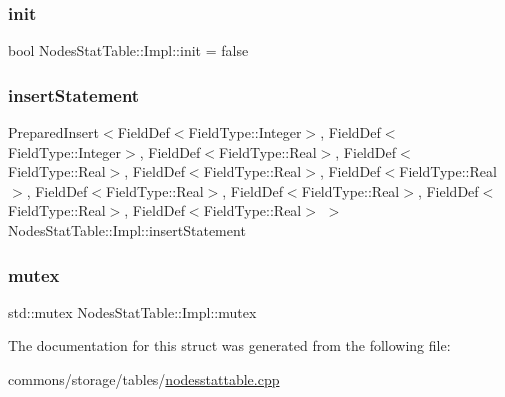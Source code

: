 \mbox{\label{struct_nodes_stat_table_1_1_impl_a9b36da64b39ad87cffd19c5b374efe1b}} 
\subsubsection{\texorpdfstring{init}{init}}
{\footnotesize\ttfamily bool Nodes\+Stat\+Table\+::\+Impl\+::init = false}

\mbox{\label{struct_nodes_stat_table_1_1_impl_aab28521342ff3e319b9451fb42a2c857}} 
\subsubsection{\texorpdfstring{insertStatement}{insertStatement}}
{\footnotesize\ttfamily Prepared\+Insert$<$Field\+Def$<$Field\+Type\+::\+Integer$>$, Field\+Def$<$Field\+Type\+::\+Integer$>$, Field\+Def$<$Field\+Type\+::\+Real$>$, Field\+Def$<$Field\+Type\+::\+Real$>$, Field\+Def$<$Field\+Type\+::\+Real$>$, Field\+Def$<$Field\+Type\+::\+Real$>$, Field\+Def$<$Field\+Type\+::\+Real$>$, Field\+Def$<$Field\+Type\+::\+Real$>$, Field\+Def$<$Field\+Type\+::\+Real$>$, Field\+Def$<$Field\+Type\+::\+Real$>$ $>$ Nodes\+Stat\+Table\+::\+Impl\+::insert\+Statement}

\mbox{\label{struct_nodes_stat_table_1_1_impl_aada6698f52748c60bf687c35df59bba5}} 
\subsubsection{\texorpdfstring{mutex}{mutex}}
{\footnotesize\ttfamily std\+::mutex Nodes\+Stat\+Table\+::\+Impl\+::mutex}



The documentation for this struct was generated from the following file\+:\begin{DoxyCompactItemize}
\item 
commons/storage/tables/\mbox{\hyperlink{nodesstattable_8cpp}{nodesstattable.\+cpp}}\end{DoxyCompactItemize}
